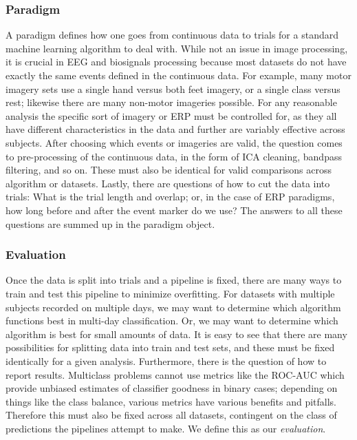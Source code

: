 \subsubsection{Paradigm}

A paradigm defines how one goes from continuous data to trials for a standard
machine learning algorithm to deal with. While not an issue in image processing,
it is crucial in EEG and biosignals processing because most datasets do not have
exactly the same events defined in the continuous data. For example, many motor
imagery sets use a single hand versus both feet imagery, or a single class
versus rest; likewise there are many non-motor imageries possible. For any
reasonable analysis the specific sort of imagery or ERP must be controlled for,
as they all have different characteristics in the data and further are variably
effective across subjects\cite{Scherer2015}. After choosing which events or
imageries are valid, the question comes to pre-processing of the continuous
data, in the form of ICA cleaning, bandpass filtering, and so on. These must
also be identical for valid comparisons across algorithm or datasets. Lastly, there are
questions of how to cut the data into trials: What is the trial length and
overlap; or, in the case of ERP paradigms, how long before and after the event
marker do we use? The answers to all these questions are summed up in the
paradigm object.

\subsubsection{Evaluation}

Once the data is split into trials and a pipeline is fixed, there are many ways to train and test this pipeline to minimize overfitting. For datasets with multiple subjects recorded on multiple days, we may want to determine which algorithm functions best in multi-day classification. Or, we may want to determine which algorithm is best for small amounts of data. It is easy to see that there are many possibilities for splitting data into train and test sets, and these must be fixed identically for a given analysis. Furthermore, there is the question of how to report results. Multiclass problems cannot use metrics like the ROC-AUC which provide unbiased estimates of classifier goodness in binary cases; depending on things like the class balance, various metrics have various benefits and pitfalls. Therefore this must also be fixed across all datasets, contingent on the class of predictions the pipelines attempt to make. We define this as our \emph{evaluation}.

